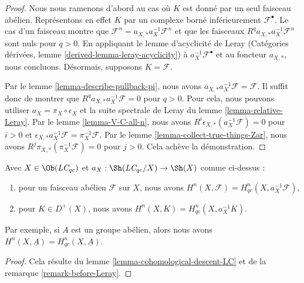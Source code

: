 \begin{proof}
Nous nous ramenons d'abord au cas où $K$ est donné par un seul faisceau
abélien. Représentons en effet $K$ par un complexe borné inférieurement
$\mathcal{F}^\bullet$. Le cas d'un faisceau montre que
$\mathcal{F}^n = a_{X, *} a_X^{-1} \mathcal{F}^n$
et que les faisceaux $R^qa_{X, *}a_X^{-1}\mathcal{F}^n$ sont nuls pour
$q > 0$. En appliquant le lemme d'acyclicité de Leray
(Catégories dérivées, lemme \ref{derived-lemma-leray-acyclicity}) à
$a_X^{-1}\mathcal{F}^\bullet$ et au foncteur $a_{X, *}$, nous concluons.
Désormais, supposons $K = \mathcal{F}$.

\medskip\noindent
Par le lemme \ref{lemma-describe-pullback-pi}, nous avons
$a_{X, *}a_X^{-1}\mathcal{F} = \mathcal{F}$. Il suffit donc de montrer que
$R^qa_{X, *}a_X^{-1}\mathcal{F} = 0$ pour $q > 0$.
Pour cela, nous pouvons utiliser $a_X = \pi_X \circ \epsilon_X$ et la suite
spectrale de Leray du lemme \ref{lemma-relative-Leray}.
Par le lemme \ref{lemma-V-C-all-n}, nous avons
$R^i\epsilon_{X, *}(a_X^{-1}\mathcal{F}) = 0$ pour $i > 0$ et
$\epsilon_{X, *}a_X^{-1}\mathcal{F} = \pi_X^{-1}\mathcal{F}$.
Par le lemme \ref{lemma-collect-true-things-Zar}, nous avons
$R^j\pi_{X, *}(\pi_X^{-1}\mathcal{F}) = 0$ pour $j > 0$.
Cela achève la démonstration.
\end{proof}

\begin{lemma}
\label{lemma-compare-cohomology-LC}
Avec $X \in \Ob(\textit{LC}_{qc})$ et
$a_X : \Sh(\textit{LC}_{qc}/X) \to \Sh(X)$ comme ci-dessus :
\begin{enumerate}
\item pour un faisceau abélien $\mathcal{F}$ sur $X$, nous avons
$H^n(X, \mathcal{F}) = H^n_{qc}(X, a_X^{-1}\mathcal{F})$,
\item pour $K \in D^+(X)$, nous avons
$H^n(X, K) = H^n_{qc}(X, a_X^{-1}K)$.
\end{enumerate}
Par exemple, si $A$ est un groupe abélien, alors nous avons
$H^n(X, \underline{A}) = H^n_{qc}(X, \underline{A})$.
\end{lemma}

\begin{proof}
Cela résulte du lemme \ref{lemma-cohomological-descent-LC} et de la
remarque \ref{remark-before-Leray}.
\end{proof}











